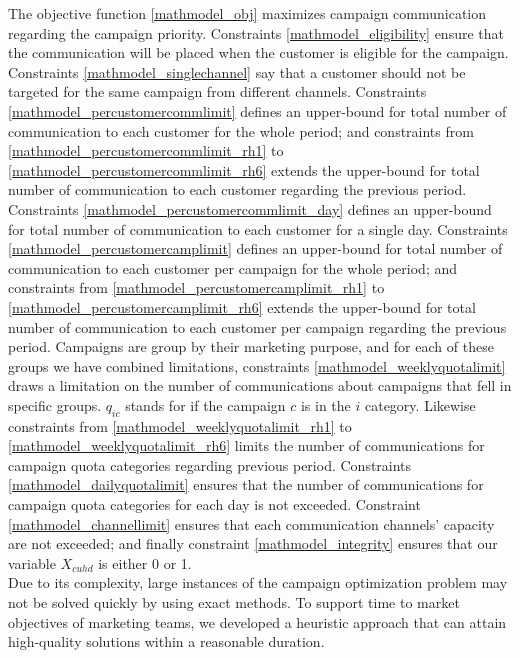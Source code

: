 \documentclass[11pt]{article}
\begin{document}
The objective function \eqref{mathmodel_obj} maximizes campaign communication regarding the campaign priority. Constraints \eqref{mathmodel_eligibility} ensure that the communication will be placed when the customer is eligible for the campaign. Constraints \eqref{mathmodel_singlechannel} say that a customer should not be targeted for the same campaign from different channels. Constraints \eqref{mathmodel_percustomercommlimit} defines an upper-bound for total number of communication to each customer for the whole period; and constraints from \eqref{mathmodel_percustomercommlimit_rh1} to \eqref{mathmodel_percustomercommlimit_rh6} extends the upper-bound for total number of communication to each customer regarding the previous period. Constraints \eqref{mathmodel_percustomercommlimit_day} defines an upper-bound for total number of communication to each customer for a single day. Constraints \eqref{mathmodel_percustomercamplimit} defines an upper-bound for total number of communication to each customer per campaign for the whole period; and constraints from \eqref{mathmodel_percustomercamplimit_rh1} to \eqref{mathmodel_percustomercamplimit_rh6} extends the upper-bound for total number of communication to each customer per campaign regarding the previous period. Campaigns are group by their marketing purpose, and for each of these groups we have combined limitations, constraints \eqref{mathmodel_weeklyquotalimit} draws a limitation on the number of communications about campaigns that fell in specific groups. $q_{{i}{c}}$ stands for if the campaign $c$ is in the $i$ category. Likewise constraints from \eqref{mathmodel_weeklyquotalimit_rh1} to \eqref{mathmodel_weeklyquotalimit_rh6} limits the number of communications for campaign quota categories regarding previous period. Constraints \eqref{mathmodel_dailyquotalimit} ensures that the number of communications for campaign quota categories for each day is not exceeded. Constraint \eqref{mathmodel_channellimit} ensures that each communication channels' capacity are not exceeded; and finally constraint \eqref{mathmodel_integrity} ensures that our variable $X_{{c}{u}{h}{d}}$ is either 0 or 1.\\

Due to its complexity, large instances of the campaign optimization problem may not be solved quickly by using exact methods. To support time to market objectives of marketing teams, we developed a heuristic approach that can attain high-quality solutions within a reasonable duration.

\end{document}
